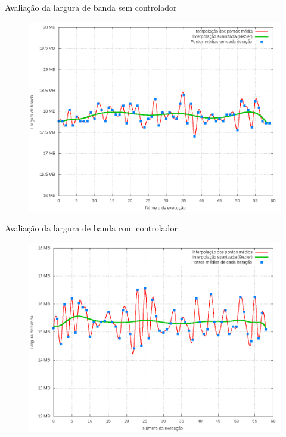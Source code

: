 \begin{frame}{Avaliação da largura de banda sem controlador}

    \begin{figure}[!htb]
        \centering
        \includegraphics[scale=.35]{images/bandwidth-no-ctrl}
    \end{figure}
\end{frame}



\begin{frame}{Avaliação da largura de banda com controlador}

    \begin{figure}[!htb]
        \centering
        \includegraphics[scale=.35]{images/bandwidth-ctrl}
    \end{figure}
\end{frame}



